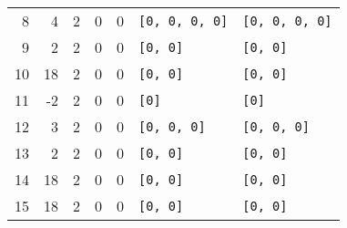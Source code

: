 \begin{landscape}
\begin{algorithm}
{{{{\begin{tabular}{r|rrrrll}
8 & 4 & 2 & 0 & 0 & \texttt{[0, 0, 0, 0]} & \texttt{[0, 0, 0, 0]} \\
9 & 2 & 2 & 0 & 0 & \texttt{[0, 0]} & \texttt{[0, 0]} \\
10 & 18 & 2 & 0 & 0 & \texttt{[0, 0]} & \texttt{[0, 0]} \\
11 & -2 & 2 & 0 & 0 & \texttt{[0]} & \texttt{[0]} \\
12 & 3 & 2 & 0 & 0 & \texttt{[0, 0, 0]} & \texttt{[0, 0, 0]} \\
13 & 2 & 2 & 0 & 0 & \texttt{[0, 0]} & \texttt{[0, 0]} \\
14 & 18 & 2 & 0 & 0 & \texttt{[0, 0]} & \texttt{[0, 0]} \\
15 & 18 & 2 & 0 & 0 & \texttt{[0, 0]} & \texttt{[0, 0]} \\
\end{tabular}
}}}}
\end{algorithm}

\end{landscape}

